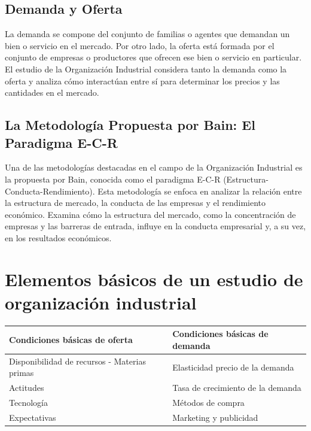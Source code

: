 \documentclass[
  doc,
  floatsintext,
  longtable,
  a4paper,
  nolmodern,
  notxfonts,
  notimes,
  12pt,
  colorlinks=true,linkcolor=blue,citecolor=blue,urlcolor=blue]{apa7}
\newcounter{none} %
\begin{document}
\subsection{Demanda y Oferta}\label{demanda-y-oferta}

La demanda se compone del conjunto de familias o agentes que demandan un
bien o servicio en el mercado. Por otro lado, la oferta está formada por
el conjunto de empresas o productores que ofrecen ese bien o servicio en
particular. El estudio de la Organización Industrial considera tanto la
demanda como la oferta y analiza cómo interactúan entre sí para
determinar los precios y las cantidades en el mercado.

\subsection{La Metodología Propuesta por Bain: El Paradigma
E-C-R}\label{la-metodologuxeda-propuesta-por-bain-el-paradigma-e-c-r}

Una de las metodologías destacadas en el campo de la Organización
Industrial es la propuesta por Bain, conocida como el paradigma E-C-R
(Estructura-Conducta-Rendimiento). Esta metodología se enfoca en
analizar la relación entre la estructura de mercado, la conducta de las
empresas y el rendimiento económico. Examina cómo la estructura del
mercado, como la concentración de empresas y las barreras de entrada,
influye en la conducta empresarial y, a su vez, en los resultados
económicos.

\section{Elementos básicos de un estudio de organización
industrial}\label{elementos-buxe1sicos-de-un-estudio-de-organizaciuxf3n-industrial}

{\def\LTcaptype{none} %
\begin{longtable}[]{@{}
  >{\raggedright\arraybackslash}p{}
  >{\raggedright\arraybackslash}p{}@{}}
\toprule\noalign{}
\begin{minipage}[b]{\linewidth}\raggedright
Condiciones básicas de oferta
\end{minipage} & \begin{minipage}[b]{\linewidth}\raggedright
Condiciones básicas de demanda
\end{minipage} \\
\midrule\noalign{}
\endhead
\bottomrule\noalign{}
\endlastfoot
Disponibilidad de recursos - Materias primas & Elasticidad precio de la
demanda \\
Actitudes & Tasa de crecimiento de la demanda \\
Tecnología & Métodos de compra \\
Expectativas & Marketing y publicidad \\
\end{longtable}
}
\end{document}
